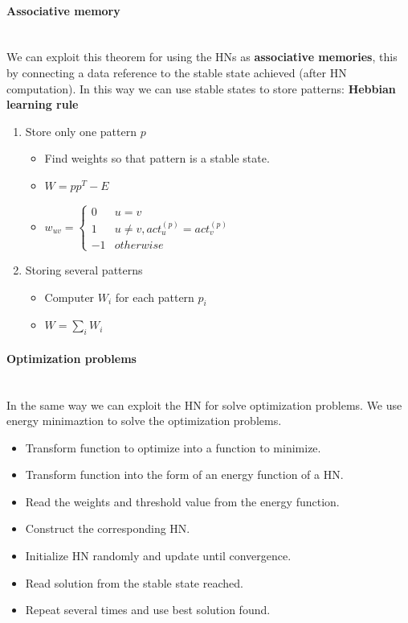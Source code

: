 \documentclass{article}
\begin{document}
\paragraph{Associative memory}\mbox{}\\
We can exploit this theorem for using the HNs as \textbf{associative memories},
this by connecting a data reference to the stable state achieved (after HN computation).
In this way we can use stable states to store patterns: \textbf{Hebbian learning rule}
\begin{enumerate}
    \item Store only one pattern $p$
        \begin{itemize}
            \item Find weights so that pattern is a stable state.
            \item $W=pp^T - E$
            \item $w_{uv}=\begin{cases}0 &u=v\\ 1 & u\neq v,act^{(p)}_u=act^{(p)}_v\\ -1 & otherwise   \end{cases}$
        \end{itemize}
    \item Storing several patterns
        \begin{itemize}
            \item Computer $W_i$ for each pattern $p_i$
            \item $W=\sum_i W_i$
        \end{itemize}
\end{enumerate}
\paragraph{Optimization problems}\mbox{}\\
In the same way we can exploit the HN for solve optimization problems. We use energy minimaztion to
solve the optimization problems.
\begin{itemize}
    \item Transform function to optimize into a function to minimize.
    \item Transform function into the form of an energy function of a HN.
    \item Read the weights and threshold value from the energy function.
    \item Construct the corresponding HN.
    \item Initialize HN randomly and update until convergence.
    \item Read solution from the stable state reached.
    \item Repeat several times and use best solution found.
\end{itemize}
\end{document}
